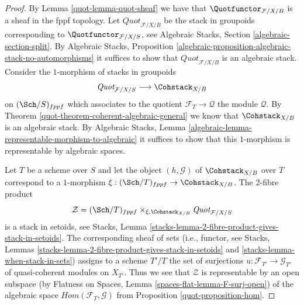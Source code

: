 \begin{proof}

By Lemma \ref{quot-lemma-quot-sheaf}
we have that $\Quotfunctor_{\mathcal{F}/X/B}$ is a sheaf in the
fppf topology. Let $\textit{Quot}_{\mathcal{F}/X/B}$ be the stack in
groupoids corresponding to $\Quotfunctor_{\mathcal{F}/X/S}$, see
Algebraic Stacks, Section \ref{algebraic-section-split}.
By Algebraic Stacks, Proposition
\ref{algebraic-proposition-algebraic-stack-no-automorphisms}
it suffices to show that $\textit{Quot}_{\mathcal{F}/X/B}$
is an algebraic stack.
Consider the $1$-morphism of stacks in groupoids
$$
\textit{Quot}_{\mathcal{F}/X/S}
\longrightarrow
\Cohstack_{X/B}
$$
on $(\Sch/S)_{fppf}$ which associates to the quotient
$\mathcal{F}_T \to \mathcal{Q}$ the module $\mathcal{Q}$.
By Theorem \ref{quot-theorem-coherent-algebraic-general} we know that
$\Cohstack_{X/B}$ is an algebraic stack.
By Algebraic Stacks, Lemma
\ref{algebraic-lemma-representable-morphism-to-algebraic}
it suffices to show that this $1$-morphism is representable
by algebraic spaces.

\medskip\noindent
Let $T$ be a scheme over $S$ and let the object $(h, \mathcal{G})$ of
$\Cohstack_{X/B}$ over $T$ correspond
to a $1$-morphism $\xi : (\Sch/T)_{fppf} \to \Cohstack_{X/B}$.
The $2$-fibre product
$$
\mathcal{Z} =
(\Sch/T)_{fppf}
\times_{\xi, \Cohstack_{X/B}}
\textit{Quot}_{\mathcal{F}/X/S}
$$
is a stack in setoids, see
Stacks, Lemma \ref{stacks-lemma-2-fibre-product-gives-stack-in-setoids}.
The corresponding sheaf of sets (i.e., functor, see
Stacks, Lemmas
\ref{stacks-lemma-2-fibre-product-gives-stack-in-setoids} and
\ref{stacks-lemma-when-stack-in-sets}) assigns to a scheme
$T'/T$ the set of surjections $u : \mathcal{F}_{T'} \to \mathcal{G}_{T'}$
of quasi-coherent modules on $X_{T'}$. Thus we see that
$\mathcal{Z}$ is representable by an open subspace
(by Flatness on Spaces, Lemma \ref{spaces-flat-lemma-F-surj-open})
of the algebraic space
$\mathit{Hom}(\mathcal{F}_T, \mathcal{G})$ from
Proposition \ref{quot-proposition-hom}.
\end{proof}

